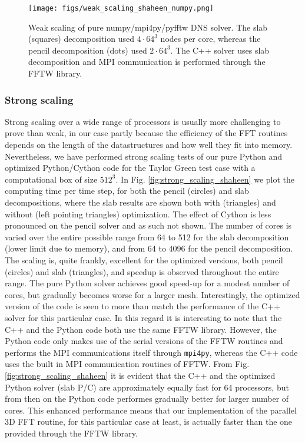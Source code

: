\documentclass[11pt, oneside]{article}
\newcommand{\inpyth}{\lstinline[style=pythonstyle, basicstyle=\ttfamily]} %[]%
\begin{document}
\begin{figure}
\texttt{[image: figs/weak\_scaling\_shaheen\_numpy.png]}
\caption{Weak scaling of pure numpy/mpi4py/pyfftw DNS solver. The slab (squares) decomposition used $4 \cdot 64^3$ nodes per core, whereas the pencil decomposition (dots) used $2 \cdot 64^3 $. The C++ solver uses slab decomposition and MPI communication is performed through the FFTW library. }
\label{fig:weak_scaling_shaheen}
\end{figure}

\subsubsection{Strong scaling}
\label{sec:strong_scaling}
Strong scaling over a wide range of processors is usually more challenging 
to prove than weak, in our case partly because the efficiency of the FFT routines 
depends on the length of the datastructures and how well they fit into 
memory. Nevertheless, we have performed strong scaling tests of our pure Python and optimized 
Python/Cython code for the Taylor Green test case with a computational box of size $512^3$. In Fig. 
\ref{fig:strong_scaling_shaheen} we plot the computing time per time step, for both the pencil (circles) and slab decompositions, where the slab results are shown both with (triangles) and without (left pointing triangles) optimization. The effect of Cython is less pronounced on the pencil solver and as such not shown. The number of 
cores is varied over the entire possible range from 64 to 512 for the slab 
decomposition (lower limit due to memory), and from 64 to 4096 for the 
pencil decomposition. The scaling is, quite frankly, excellent for the optimized versions, both pencil (circles) and slab (triangles), and speedup is observed 
throughout the entire range. The pure Python solver achieves good speed-up 
for a modest number of cores, but gradually becomes worse for a larger mesh. Interestingly, the optimized version of the code is seen 
to more than match the performance of the C++ solver for this particular 
case. In this regard it is interesting to note that the C++ and the Python code both use the same FFTW library. However, the Python code only makes use of the serial versions of the FFTW 
routines and performs the MPI communications itself through 
\inpyth{mpi4py}, whereas the C++ code uses the built in MPI communication routines of FFTW. From Fig. \ref{fig:strong_scaling_shaheen} it is evident 
that the C++ and the optimized Python solver (slab P/C) are approximately 
equally fast for 64 processors, but from then on the Python code performes 
gradually better for larger number of cores. This enhanced performance 
means that our implementation of the parallel 3D FFT routine, for this 
particular case at least, is actually faster than the one provided through the FFTW library.
\end{document}
